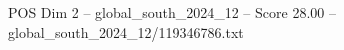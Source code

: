 \begin{textsample}{POS Dim 2 – global\_south\_2024\_12 – Score 28.00 – global\_south\_2024\_12/119346786.txt}
\end{textsample}
